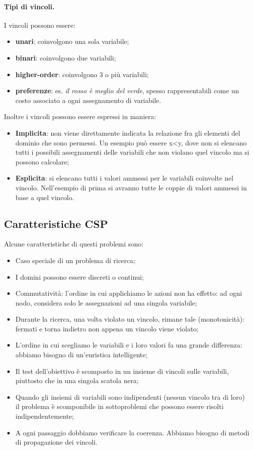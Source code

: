 \paragraph{Tipi di vincoli.} I vincoli possono essere:
\begin{itemize}
    \item \textbf{unari}: coinvolgono una sola variabile;
    \item \textbf{binari}: coinvolgono due variabili;
    \item \textbf{higher-order}: coinvolgono 3 o più variabili;
    \item \textbf{preferenze}: es. \textit{il rosso è meglio del verde}, spesso rappresentabili come un costo associato a ogni assegnamento di variabile.
\end{itemize}
Inoltre i vincoli possono essere espressi in maniera:
\begin{itemize}
    \item \textbf{Implicita}: non viene direttamente indicata la relazione fra gli elementi del dominio che sono permessi. Un esempio può essere x<y, dove non si elencano tutti i possibili assegnamenti delle variabili che non violano quel vincolo ma si possono calcolare;
    \item \textbf{Esplicita}: si elencano tutti i valori ammessi per le variabili coinvolte nel vincolo. Nell'esempio di prima si avranno tutte le coppie di valori ammessi in base a quel vincolo.
\end{itemize}
\subsection{Caratteristiche CSP}
Alcune caratteristiche di questi problemi sono:
\begin{itemize}
    \item Caso speciale di un problema di ricerca;
    \item I domini possono essere discreti o continui;
    \item Commutatività: l'ordine in cui applichiamo le azioni non ha effetto: ad ogni nodo, considera solo le assegnazioni ad una singola variabile;
    \item Durante la ricerca, una volta violato un vincolo, rimane tale (monotonicità): fermati e torna indietro non appena un vincolo viene violato;
    \item L'ordine in cui scegliamo le variabili e i loro valori fa una grande differenza: abbiamo bisogno di un'euristica intelligente;
    \item Il test dell'obiettivo è scomposto in un insieme di vincoli sulle variabili, piuttosto che in una singola scatola nera;
    \item Quando gli insiemi di variabili sono indipendenti (nessun vincolo tra di loro) il problema è scomponibile in sottoproblemi che possono essere risolti indipendentemente;
    \item A ogni passaggio dobbiamo verificare la coerenza. Abbiamo bisogno di metodi di propagazione dei vincoli.
\end{itemize}

